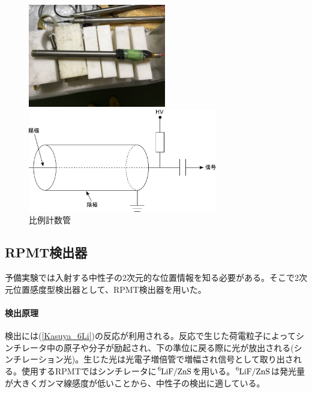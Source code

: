 \begin{figure}[h]
\begin{minipage}{0.45\hsize}
\begin{center}
\includegraphics[height=4.5cm]{detector/detector_photo1.jpg}
\end{center}
\end{minipage}
\begin{minipage}{0.55\hsize}
\begin{center}
\includegraphics[height=4.5cm]{detector/detector_fig1.pdf}
\end{center}
\end{minipage}
\caption{比例計数管}
\end{figure}

\subsection{RPMT検出器}
予備実験では入射する中性子の2次元的な位置情報を知る必要がある。そこで2次元位置感度型検出器として、RPMT検出器を用いた。

\paragraph{検出原理}
検出には(\ref{Kasuya_6Li})の反応が利用される。反応で生じた荷電粒子によってシンチレータ中の原子や分子が励起され、下の準位に戻る際に光が放出される(シンチレーション光)。生じた光は光電子増倍管で増幅され信号として取り出される。使用するRPMTではシンチレータに$\ce{^6LiF}/\ce{ZnS}$を用いる。$\ce{^6LiF}/\ce{ZnS}$は発光量が大きくガンマ線感度が低いことから、中性子の検出に適している。

